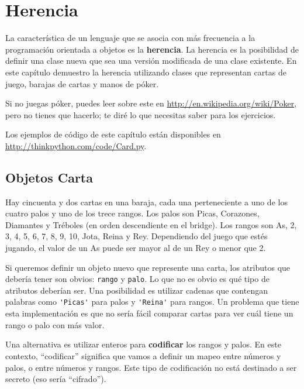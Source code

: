\documentclass[10pt]{book}
\begin{document}
\chapter{Herencia}

La característica de un lenguaje que se asocia con más frecuencia a la programación
orientada a objetos es la {\bf herencia}.  La herencia es la posibilidad de
definir una clase nueva que sea una versión modificada de una clase existente.
En este capítulo demuestro la herencia utilizando clases que representan
cartas de juego, barajas de cartas y manos de póker.

Si no juegas
póker, puedes leer sobre este en
\url{http://en.wikipedia.org/wiki/Poker}, pero no tienes que hacerlo; 
te diré lo que necesitas saber para los ejercicios.

Los ejemplos de código de
este capítulo están disponibles en
\url{http://thinkpython.com/code/Card.py}.


\section{Objetos Carta}

Hay cincuenta y dos cartas en una baraja, cada una perteneciente a uno de
los cuatro palos y uno de los trece rangos.  Los palos son Picas, Corazones,
Diamantes y Tréboles (en orden descendiente en el bridge).  Los rangos son
As, 2, 3, 4, 5, 6, 7, 8, 9, 10, Jota, Reina y Rey.  Dependiendo del
juego que estés jugando, el valor de un As puede ser mayor al de un Rey
o menor que 2.

Si queremos definir un objeto nuevo que represente una carta, los
atributos que debería tener son obvios: {\tt rango} y
{\tt palo}.  Lo que no es obvio es qué tipo de atributos
deberían ser.  Una posibilidad es utilizar cadenas que contengan palabras como
\verb"'Picas'" para palos y \verb"'Reina'" para rangos.  Un problema que
tiene esta implementación es que no sería fácil comparar cartas para
ver cuál tiene un rango o palo con más valor.

Una alternativa es utilizar enteros para {\bf codificar} los rangos y palos.
En este contexto, ``codificar'' significa que vamos a definir un mapeo
entre números y palos, o entre números y rangos.  Este
tipo de codificación no está destinado a ser secreto (eso
sería ``cifrado'').

\newcommand{\mymapsto}{$\mapsto$}
\end{document}
